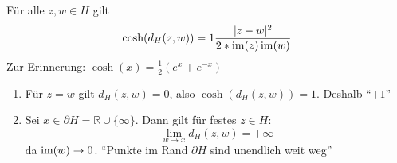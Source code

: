 \documentclass[../main.tex]{subfiles}
\begin{document}
\begin{proposition}
    Für alle $z,w \in H$ gilt 
    $$\cosh (d_H(z,w))=1 \frac{|z-w|^2}{2 * \operatorname{im} (z) \operatorname{im}(w)}$$
    Zur Erinnerung: $\cosh (x)=\frac{1}{2}(e^x + e^{-x})$
\end{proposition}
\begin{remarks}
    \leavevmode
    \begin{enumerate}
        \item Für $z=w$ gilt $d_H (z,w)=0$, also $\cosh(d_H(z,w))=1$. Deshalb ``$+1$''
        \item Sei $x\in \partial H = \mathbb{R} \cup \{\infty\}$. Dann gilt für festes $z\in H$:
            $$\lim_{w \to x} d_H(z,w) = + \infty$$ da $\operatorname{im}(w)\to 0$.
            ``Punkte im Rand $\partial H$ sind unendlich weit weg''
    \end{enumerate}
\end{remarks}
\end{document}
